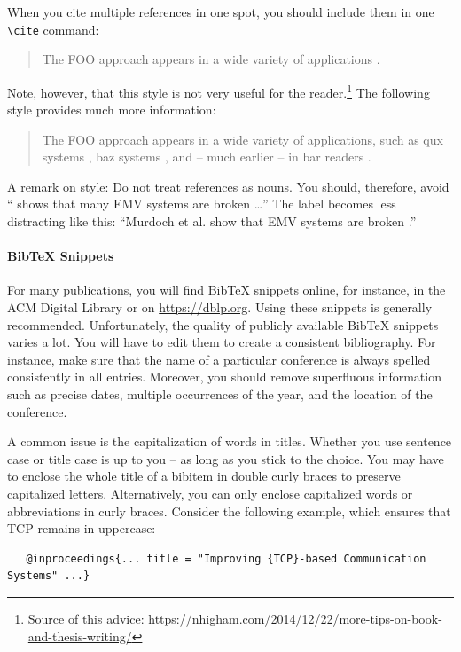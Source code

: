 When you cite multiple references in one spot, you should include them in one \verb|\cite| command:
\begin{quote}
  The FOO approach appears in a wide variety of applications \cite{murdoch_steven_j._chip_2010,anderson_ross_emv:_2014,kou_weidong_secure_2003}.
\end{quote}

Note, however, that this style is not very useful for the reader.\footnote{Source of this advice: \url{https://nhigham.com/2014/12/22/more-tips-on-book-and-thesis-writing/}} The following style provides much more information:
\begin{quote}
The FOO approach appears in a wide variety of applications, such as qux systems \cite{murdoch_steven_j._chip_2010}, baz systems \cite{anderson_ross_emv:_2014}, and -- much earlier -- in bar readers \cite{kou_weidong_secure_2003}.
\end{quote}

A remark on style: Do not treat references as nouns. You should, therefore, avoid ``\cite{murdoch_steven_j._chip_2010} shows that many EMV systems are broken \ldots'' The label becomes less distracting like this: ``Murdoch et al. show that EMV systems are broken  \cite{murdoch_steven_j._chip_2010}.''

\paragraph{BibTeX Snippets}

For many publications, you will find BibTeX snippets online, for instance, in the ACM Digital Library or on \url{https://dblp.org}. Using these snippets is generally recommended. Unfortunately, the quality of publicly available BibTeX snippets varies a lot. You will have to edit them to create a consistent bibliography. For instance, make sure that the name of a particular conference is always spelled consistently in all entries. Moreover, you should remove superfluous information such as precise dates, multiple occurrences of the year, and the location of the conference.

A common issue is the capitalization of words in titles. Whether you use sentence case or title case is up to you -- as long as you stick to the choice. You may have to enclose the whole title of a bibitem in double curly braces to preserve capitalized letters. Alternatively, you can only enclose capitalized words or abbreviations in curly braces. Consider the following example, which ensures that TCP remains in uppercase:
\begin{verbatim}
   @inproceedings{... title = "Improving {TCP}-based Communication Systems" ...}
\end{verbatim}

